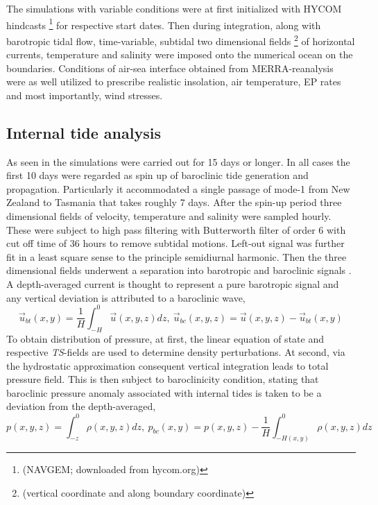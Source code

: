 \documentclass[12pt]{article}
\begin{document}
The simulations with variable conditions were at first initialized with HYCOM hindcasts 
\footnote{(NAVGEM;	downloaded from hycom.org)} for respective start dates. Then during 
integration, 
along with barotropic tidal flow, time-variable, subtidal two dimensional fields 
\footnote{(vertical coordinate and along boundary coordinate)} of horizontal currents, temperature 
and salinity were imposed onto the numerical ocean on the boundaries. Conditions of air-sea 
interface obtained from MERRA-reanalysis \citep{rienecker2011merra} were as well utilized to 
prescribe realistic insolation, air temperature, EP rates and most importantly, wind stresses.

\subsection{Internal tide analysis}
As seen in  the simulations were carried out for 15 days or longer. In all 
cases the first 10 days were regarded as spin up of baroclinic tide generation and 
propagation. Particularly it accommodated a single passage of mode-1 from New Zealand 
to Tasmania that takes roughly 7 days. After the spin-up period three 
dimensional fields of velocity, temperature and salinity were sampled hourly. These 
were subject to high pass filtering with Butterworth filter of order $6$ with cut off time of $36$ 
hours to remove subtidal motions. Left-out signal was further fit in a least square sense to the 
principle semidiurnal harmonic. Then the three dimensional fields 
underwent a separation into barotropic and baroclinic signals \citep{cummins1997simulation, 
kunze2002internal, carter2008energetics}. A depth-averaged current is thought to represent a pure 
barotropic signal and any vertical deviation is attributed to a baroclinic wave,
\begin{equation}
\label{ch2:bt_bc_vel}
\vec{u}_{bt}(x,y) = \frac{1}{H} \int_{-H}^{0} \vec{u}(x,y,z)  dz,~\vec{u}_{bc}(x,y,z) =  
\vec{u}(x,y,z) - \vec{u}_{bt}(x,y)
\end{equation}
To obtain distribution of pressure, at first, the linear equation of state and respective 
\textit{TS}-fields are used to determine density perturbations. At second, via the hydrostatic 
approximation consequent vertical integration leads to total pressure field. This 
is then subject to baroclinicity condition, stating that baroclinic pressure anomaly associated 
with internal tides is taken to be a deviation from the depth-averaged,
\begin{equation}
\label{ch2:bt_bc_pres}
p(x,y,z) = \int_{-z}^{0} \rho(x,y,z) dz,~p_{bc}(x,y) = p(x,y,z) - \frac{1}{H} \int_{-H(x,y)}^{0} 
\rho(x,y,z) dz
\end{equation}
\end{document}
